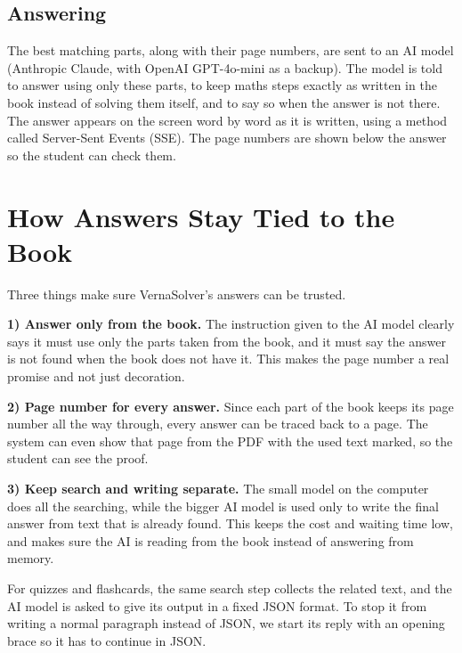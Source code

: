 \documentclass[conference]{IEEEtran}
\begin{document}
\subsection{Answering}
The best matching parts, along with their page numbers, are sent to an AI
model (Anthropic Claude, with OpenAI GPT-4o-mini as a backup). The model
is told to answer using only these parts, to keep maths steps exactly as
written in the book instead of solving them itself, and to say so when
the answer is not there. The answer appears on the screen word by word as
it is written, using a method called Server-Sent Events (SSE). The page
numbers are shown below the answer so the student can check them.

\section{How Answers Stay Tied to the Book}
Three things make sure VernaSolver's answers can be trusted.

\textbf{1) Answer only from the book.} The instruction given to the AI
model clearly says it must use only the parts taken from the book, and it
must say the answer is not found when the book does not have it. This
makes the page number a real promise and not just decoration.

\textbf{2) Page number for every answer.} Since each part of the book
keeps its page number all the way through, every answer can be traced
back to a page. The system can even show that page from the PDF with the
used text marked, so the student can see the proof.

\textbf{3) Keep search and writing separate.} The small model on the
computer does all the searching, while the bigger AI model is used only
to write the final answer from text that is already found. This keeps the
cost and waiting time low, and makes sure the AI is reading from the book
instead of answering from memory.

For quizzes and flashcards, the same search step collects the related
text, and the AI model is asked to give its output in a fixed JSON
format. To stop it from writing a normal paragraph instead of JSON, we
start its reply with an opening brace so it has to continue in JSON.

\end{document}

